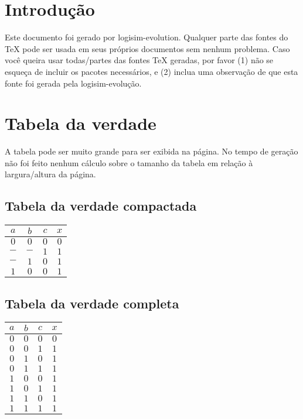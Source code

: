 \documentclass [15pt,a4paper,twoside]{article}
\begin{document}
\section{Introdução}
Este documento foi gerado por logisim-evolution. Qualquer parte das fontes do TeX pode ser usada em seus próprios documentos sem nenhum problema. Caso você queira usar todas/partes das fontes TeX geradas, por favor (1) não se esqueça de incluir os pacotes necessários, e (2) inclua uma observação de que esta fonte foi gerada pela logisim-evolução.
\section{Tabela da verdade}
A tabela pode ser muito grande para ser exibida na página. No tempo de geração não foi feito nenhum cálculo sobre o tamanho da tabela em relação à largura/altura da página.
\subsection{Tabela da verdade compactada}
\begin{center}
\begin{tabular}{ccc|c}
$a$&$b$&$c$&$x$\\
\hline
$0$&$0$&$0$&$0$\\
$-$&$-$&$1$&$1$\\
$-$&$1$&$0$&$1$\\
$1$&$0$&$0$&$1$\\

\end{tabular}
\end{center}
\subsection{Tabela da verdade completa}
\begin{center}
\begin{tabular}{ccc|c}
$a$&$b$&$c$&$x$\\
\hline
$0$&$0$&$0$&$0$\\
$0$&$0$&$1$&$1$\\
$0$&$1$&$0$&$1$\\
$0$&$1$&$1$&$1$\\
$1$&$0$&$0$&$1$\\
$1$&$0$&$1$&$1$\\
$1$&$1$&$0$&$1$\\
$1$&$1$&$1$&$1$\\

\end{tabular}
\end{center}
\end{document}
